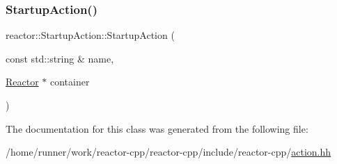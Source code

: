 \subsubsection{\texorpdfstring{Startup\+Action()}{StartupAction()}}
{\footnotesize\ttfamily reactor\+::\+Startup\+Action\+::\+Startup\+Action (\begin{DoxyParamCaption}\item[{const std\+::string \&}]{name,  }\item[{\hyperlink{classreactor_1_1Reactor}{Reactor} $\ast$}]{container }\end{DoxyParamCaption})\hspace{0.3cm}{\ttfamily [inline]}}



The documentation for this class was generated from the following file\+:\begin{DoxyCompactItemize}
\item 
/home/runner/work/reactor-\/cpp/reactor-\/cpp/include/reactor-\/cpp/\hyperlink{action_8hh}{action.\+hh}\end{DoxyCompactItemize}
